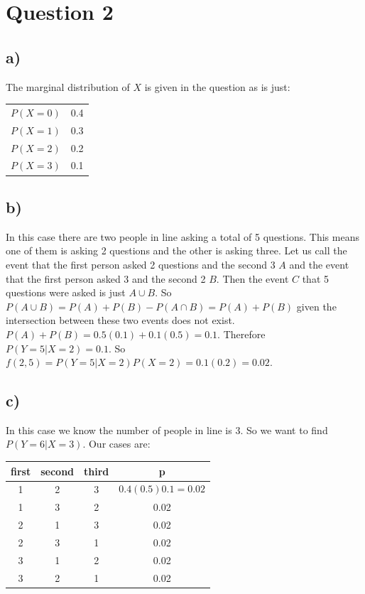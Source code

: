 \documentclass[11pt]{article}
\begin{document}
\section*{Question 2}

\subsection*{a)}

The marginal distribution of $X$ is given in the question as is just:

\begin{center}
\begin{tabular}{c| c}
$P(X=0)$ & 0.4 \\
$P(X=1)$ & 0.3 \\
$P(X=2)$ & 0.2 \\
$P(X=3)$ & 0.1
\end{tabular}
\end{center}

\subsection*{b)}

In this case there are two people in line asking a total of 5 questions. This means one of them is asking 2 questions and the other is asking three. Let us call the event that the first person asked 2 questions and the second 3 $A$ and the event that the first person asked 3 and the second 2 $B$. Then the event $C$ that 5 questions were asked is just $A\cup B$. So $P(A\cup B) = P(A) + P(B) - P(A\cap B)=P(A) + P(B)$ given the intersection between these two events does not exist. $P(A) + P(B) = 0.5(0.1) + 0.1(0.5) = 0.1$. Therefore $P(Y=5 | X=2)=0.1$. So $f(2,5)=P(Y=5 | X=2)P(X=2)=0.1(0.2)=0.02$. 

\subsection*{c)}

In this case we know the number of people in line is 3. So we want to find $P(Y=6 | X=3)$. Our cases are:

\begin{center}
\begin{tabular}{c c c | c}
first & second & third & p \\
\hline
1 & 2 & 3 & $$0.4(0.5)0.1=0.02$$\\ 
1 & 3 & 2 & 0.02 \\ 
2 & 1 & 3 & 0.02 \\ 
2 & 3 & 1 & 0.02 \\ 
3 & 1 & 2 & 0.02 \\ 
3 & 2 & 1 & 0.02

\end{tabular}
\end{center}
\end{document}
